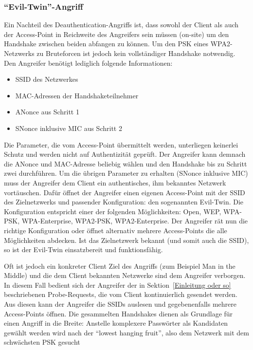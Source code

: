 \subsubsection{\enquote{Evil-Twin}-Angriff}
Ein Nachteil des Deauthentication-Angriffs ist, dass sowohl der Client als auch der Access-Point in Reichweite des Angreifers sein müssen (on-site) um den Handshake zwischen beiden abfangen zu können.
Um den PSK eines WPA2-Netzwerks zu Bruteforcen ist jedoch kein vollständiger Handshake notwendig.
Den Angreifer benötigt lediglich folgende Informationen:
\begin{itemize}
	\item SSID des Netzwerkes 
	\item MAC-Adressen der Handshaketeilnehmer
	\item ANonce aus Schritt 1
	\item SNonce inklusive MIC aus Schritt 2
\end{itemize}
Die Parameter, die vom Access-Point übermittelt werden, unterliegen keinerlei Schutz und werden nicht auf Authentizität geprüft.
Der Angreifer kann demnach die ANonce und MAC-Adresse beliebig wählen und den Handshake bis zu Schritt zwei durchführen.
Um die übrigen Parameter zu erhalten (SNonce inklusive MIC) muss der Angreifer dem Client ein authentisches, ihm bekanntes Netzwerk vortäuschen.
Dafür öffnet der Angreifer einen eigenen Access-Point mit der SSID des Zielnetzwerks und passender Konfiguration: den sogenannten Evil-Twin.
Die Konfiguration entspricht einer der folgenden Möglichkeiten: Open, WEP, WPA-PSK, WPA-Enterprise, WPA2-PSK, WPA2-Enterprise.
Der Angreifer rät nun die richtige Konfiguration oder öffnet alternativ mehrere Access-Points die alle Möglichkeiten abdecken.
Ist das Zielnetzwerk bekannt (und somit auch die SSID), so ist der Evil-Twin einsatzbereit und funktionsfähig.

Oft ist jedoch ein konkreter Client Ziel des Angriffs (zum Beispiel Man in the Middle) und die dem Client bekannten Netzwerke sind dem Angreifer verborgen.
In diesem Fall bedient sich der Angreifer der in Sektion~\ref{Einleitung oder so} beschriebenen Probe-Requests, die vom Client kontinuierlich gesendet werden.
Aus diesen kann der Angreifer die SSIDs auslesen und gegebenenfalls mehrere Access-Points öffnen.
Die gesammelten Handshakes dienen als Grundlage für einen Angriff in die Breite: Anstelle komplexere Passwörter als Kandidaten gewählt werden wird nach der \enquote{lowest hanging fruit}, also dem Netzwerk mit dem schwächsten PSK gesucht

